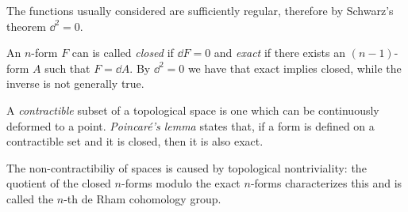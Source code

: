 \documentclass[main.tex]{subfiles}
\begin{document}
The functions usually considered are sufficiently regular, therefore by Schwarz's theorem \(\dd^2 = 0\).

An \(n\)-form \(F\) can is called \emph{closed} if \(\dd{F}= 0 \) and \emph{exact} if there exists an \((n-1)\)-form \(A\) such that \(F = \dd{A}\).
By \(\dd^2=0\) we have that exact implies closed, while the inverse is not generally true.

A \emph{contractible} subset of a topological space is one which can be continuously deformed to a point.
\emph{Poincaré's lemma} states that, if a form is defined on a contractible set and it is closed, then it is also exact.

The non-contractibiliy of spaces is caused by topological nontriviality: the quotient of the closed \(n\)-forms modulo the exact \(n\)-forms characterizes this and is called the \(n\)-th de Rham cohomology group.
\end{document}
